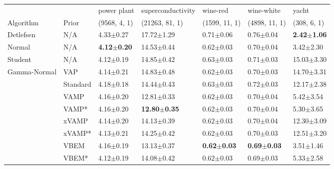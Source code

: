 \begin{tabular}{lllllll}
\midrule
             &       &             power plant &        superconductivity &                wine-red &              wine-white &                   yacht \\
Algorithm & Prior& (9568, 4, 1)& (21263, 81, 1)& (1599, 11, 1)& (4898, 11, 1)& (308, 6, 1)\\
\midrule
Detlefsen & N/A &           4.33$\pm$0.27 &           17.72$\pm$1.29 &           0.71$\pm$0.06 &           0.76$\pm$0.04 &  \textbf{2.42$\pm$1.06} \\
Normal & N/A &  \textbf{4.12$\pm$0.20} &           14.53$\pm$0.44 &           0.62$\pm$0.03 &           0.70$\pm$0.04 &           3.42$\pm$2.30 \\
Student & N/A &           4.12$\pm$0.19 &           14.85$\pm$0.42 &           0.63$\pm$0.03 &           0.71$\pm$0.03 &          15.03$\pm$3.30 \\
Gamma-Normal & VAP &           4.14$\pm$0.21 &           14.83$\pm$0.48 &           0.62$\pm$0.03 &           0.70$\pm$0.03 &          14.70$\pm$3.31 \\
             & Standard &           4.18$\pm$0.18 &           14.44$\pm$0.43 &           0.63$\pm$0.03 &           0.72$\pm$0.03 &          12.17$\pm$2.38 \\
             & VAMP &           4.16$\pm$0.20 &           12.81$\pm$0.33 &           0.62$\pm$0.03 &           0.70$\pm$0.04 &           5.42$\pm$3.54 \\
             & VAMP* &           4.16$\pm$0.20 &  \textbf{12.80$\pm$0.35} &           0.62$\pm$0.03 &           0.70$\pm$0.04 &           5.30$\pm$3.65 \\
             & xVAMP &           4.14$\pm$0.20 &           14.13$\pm$0.39 &           0.62$\pm$0.03 &           0.70$\pm$0.04 &          12.30$\pm$3.09 \\
             & xVAMP* &           4.13$\pm$0.21 &           14.25$\pm$0.42 &           0.62$\pm$0.03 &           0.70$\pm$0.03 &          12.51$\pm$3.20 \\
             & VBEM &           4.16$\pm$0.19 &           13.13$\pm$0.37 &  \textbf{0.62$\pm$0.03} &  \textbf{0.69$\pm$0.03} &           3.51$\pm$1.46 \\
             & VBEM* &           4.12$\pm$0.19 &           14.08$\pm$0.42 &           0.62$\pm$0.03 &           0.69$\pm$0.03 &           5.33$\pm$2.58 \\
\bottomrule
\end{tabular}

